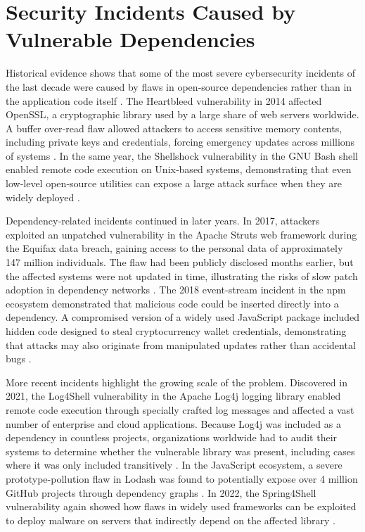 \documentclass[12pt,a4paper]{report}
\begin{document}
\section{Security Incidents Caused by Vulnerable Dependencies}

Historical evidence shows that some of the most severe cybersecurity incidents of the last decade were caused by flaws in open‑source dependencies rather than in the application code itself \parencite{2026StateSoftware2026,pontaDetectionAssessmentMitigation2020}.
The Heartbleed vulnerability in 2014 affected OpenSSL, a cryptographic library used by a large share of web servers worldwide. A buffer over‑read flaw allowed attackers to access sensitive memory contents, including private keys and credentials, forcing emergency updates across millions of systems \parencite{2026StateSoftware2026}. In the same year, the Shellshock vulnerability in the GNU Bash shell enabled remote code execution on Unix‑based systems, demonstrating that even low‑level open‑source utilities can expose a large attack surface when they are widely deployed \parencite{2026StateSoftware2026}.

Dependency‑related incidents continued in later years. In 2017, attackers exploited an unpatched vulnerability in the Apache Struts web framework during the Equifax data breach, gaining access to the personal data of approximately 147 million individuals. The flaw had been publicly disclosed months earlier, but the affected systems were not updated in time, illustrating the risks of slow patch adoption in dependency networks \parencite{cordeySoftwareSupplyChain2023,2026StateSoftware2026}. The 2018 event-stream incident in the npm ecosystem demonstrated that malicious code could be inserted directly into a dependency. A compromised version of a widely used JavaScript package included hidden code designed to steal cryptocurrency wallet credentials, demonstrating that attacks may also originate from manipulated updates rather than accidental bugs \parencite{NpmBlogArchive2018}.

More recent incidents highlight the growing scale of the problem. Discovered in 2021, the Log4Shell vulnerability in the Apache Log4j logging library enabled remote code execution through specially crafted log messages and affected a vast number of enterprise and cloud applications. Because Log4j was included as a dependency in countless projects, organizations worldwide had to audit their systems to determine whether the vulnerable library was present, including cases where it was only included transitively \parencite{falconeAnotherApacheLog4j2021,pontaDetectionAssessmentMitigation2020}. In the JavaScript ecosystem, a severe prototype-pollution flaw in Lodash was found to potentially expose over 4 million GitHub projects through dependency graphs \parencite{liuDemystifyingVulnerabilityPropagation2022}. In 2022, the Spring4Shell vulnerability again showed how flaws in widely used frameworks can be exploited to deploy malware on servers that indirectly depend on the affected library \parencite{CVE202222965AnalyzingExploitation2022}.
\end{document}

